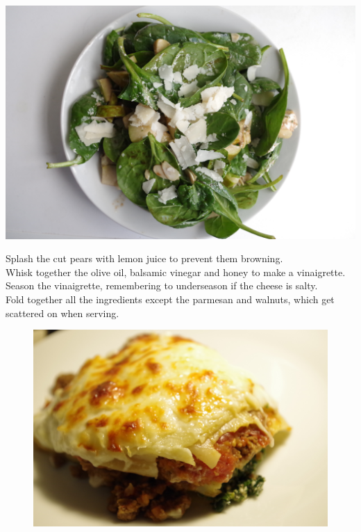 \documentclass{tufte-book}
\begin{document}
\newpage

\begin{marginfigure}%
  \includegraphics[width=\linewidth]{pearsaladabove.JPG}
\end{marginfigure}

\smallskip
Splash the cut pears with lemon juice to prevent them browning.
\\Whisk together the olive oil, balsamic vinegar and honey to make a vinaigrette.
\\Season the vinaigrette, remembering to underseason if the cheese is salty.
\\Fold together all the ingredients except the parmesan and walnuts, which get scattered on when serving.

\newpage

\begin{figure}[h]
  \includegraphics[width=\linewidth]{lasagne.jpg}%
\end{figure}
\end{document}

